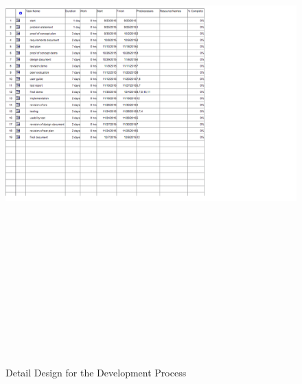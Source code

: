 \documentclass[titlepage]{article}
\begin{document}
\pagebreak

\begin{figure}
	\includegraphics[width=25cm, height=20cm]{detaildesign}
	\caption{Detail Design for the Development Process}
	\label{fig:Detail Design for the Development Process}
\end{figure}
\end{document}
